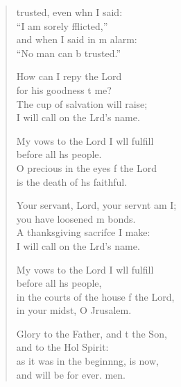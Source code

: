 \begin{verse}
  \begin{patverse}
     trusted, even whn I said: \Med\\
    “I am sorely fflicted,”\\
    and when I said in m alarm: \Med\\
    “No man can b trusted.”
    
    How can I repy the Lord \Med\\
    for his goodness t me?\\
    The cup of salvation  will raise; \Med\\
    I will call on the Lrd’s name.
    
    My vows to the Lord I w\pointup{\i}ll fulfill \Med\\
    before all h\pointup{\i}s people.\\
    O precious in the eyes f the Lord \Med\\
    is the death of h\pointup{\i}s faithful.

    Your servant, Lord, your servnt am I; \Med\\
    you have loosened m bonds.\\
    A thanksgiving sacrif\pointup{\i}ce I make: \Med\\
    I will call on the Lrd’s name.

    My vows to the Lord I w\pointup{\i}ll fulfill \Med\\
    before all h\pointup{\i}s people,\\
    in the courts of the house f the Lord, \Med\\
    in your midst, O Jrusalem.

    Glory to the Father, and t the Son, \Med\\
    and to the Hol Spirit:\\
    as it was in the beginn\pointup{\i}ng, is now, \Med\\
    and will be for ever. men.
  \end{patverse}
\end{verse}
